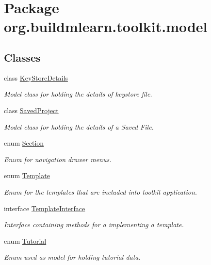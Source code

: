 \hypertarget{namespaceorg_1_1buildmlearn_1_1toolkit_1_1model}{\section{Package org.\-buildmlearn.\-toolkit.\-model}
\label{namespaceorg_1_1buildmlearn_1_1toolkit_1_1model}
}
\subsection*{Classes}
\begin{DoxyCompactItemize}
\item 
class \hyperlink{classorg_1_1buildmlearn_1_1toolkit_1_1model_1_1KeyStoreDetails}{Key\-Store\-Details}
\begin{DoxyCompactList}\small\item\em Model class for holding the details of keystore file. \end{DoxyCompactList}\item 
class \hyperlink{classorg_1_1buildmlearn_1_1toolkit_1_1model_1_1SavedProject}{Saved\-Project}
\begin{DoxyCompactList}\small\item\em Model class for holding the details of a Saved File. \end{DoxyCompactList}\item 
enum \hyperlink{enumorg_1_1buildmlearn_1_1toolkit_1_1model_1_1Section}{Section}
\begin{DoxyCompactList}\small\item\em Enum for navigation drawer menus. \end{DoxyCompactList}\item 
enum \hyperlink{enumorg_1_1buildmlearn_1_1toolkit_1_1model_1_1Template}{Template}
\begin{DoxyCompactList}\small\item\em Enum for the templates that are included into toolkit application. \end{DoxyCompactList}\item 
interface \hyperlink{interfaceorg_1_1buildmlearn_1_1toolkit_1_1model_1_1TemplateInterface}{Template\-Interface}
\begin{DoxyCompactList}\small\item\em Interface containing methods for a implementing a template. \end{DoxyCompactList}\item 
enum \hyperlink{enumorg_1_1buildmlearn_1_1toolkit_1_1model_1_1Tutorial}{Tutorial}
\begin{DoxyCompactList}\small\item\em Enum used as model for holding tutorial data. \end{DoxyCompactList}\end{DoxyCompactItemize}
